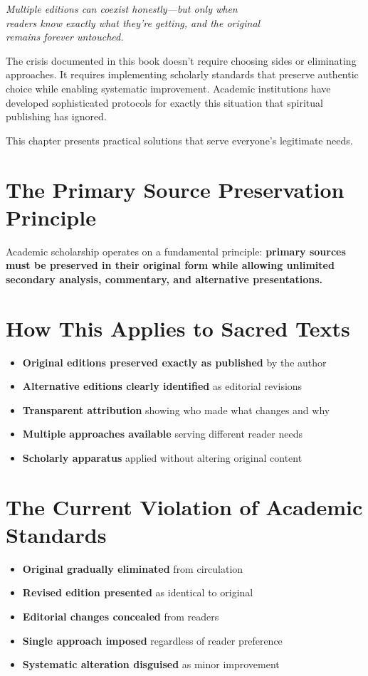 \documentclass[11pt,twoside]{book}
\begin{document}
{\centering\itshape Multiple editions can coexist honestly—but only when\\readers know exactly what they're getting, and the original\\remains forever untouched.\par}
\vspace{0.3cm}

\normalfont\justifying
The crisis documented in this book doesn't require choosing sides or eliminating approaches. It requires implementing scholarly standards that preserve authentic choice while enabling systematic improvement. Academic institutions have developed sophisticated protocols for exactly this situation that spiritual publishing has ignored.

This chapter presents practical solutions that serve everyone's legitimate needs.
\section*{The Primary Source Preservation Principle}
\label{sec:org9cff77b}

Academic scholarship operates on a fundamental principle: \textbf{\textbf{primary sources must be preserved in their original form while allowing unlimited secondary analysis, commentary, and alternative presentations.}}
\section*{How This Applies to Sacred Texts}
\label{sec:org7e2f89f}
\begin{itemize}
\item \textbf{\textbf{Original editions preserved exactly as published}} by the author
\item \textbf{\textbf{Alternative editions clearly identified}} as editorial revisions
\item \textbf{\textbf{Transparent attribution}} showing who made what changes and why
\item \textbf{\textbf{Multiple approaches available}} serving different reader needs
\item \textbf{\textbf{Scholarly apparatus}} applied without altering original content
\end{itemize}
\section*{The Current Violation of Academic Standards}
\label{sec:org40b1a47}
\begin{itemize}
\item \textbf{\textbf{Original gradually eliminated}} from circulation
\item \textbf{\textbf{Revised edition presented}} as identical to original
\item \textbf{\textbf{Editorial changes concealed}} from readers
\item \textbf{\textbf{Single approach imposed}} regardless of reader preference
\item \textbf{\textbf{Systematic alteration disguised}} as minor improvement
\end{itemize}
\end{document}

